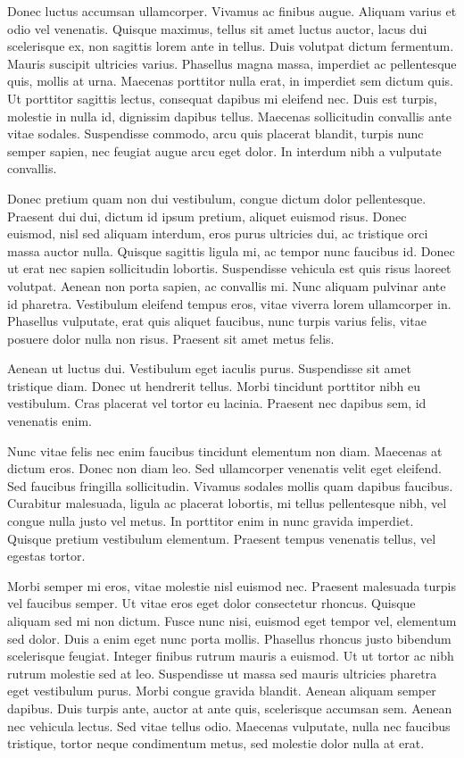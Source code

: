 \documentclass[book,A4paper,10pt,twoside,oldfontcommands]{memoir}\usepackage[]{graphicx}\usepackage[usenames,dvipsnames]{color}
\begin{document}
\begin{btUnit}
Donec luctus accumsan ullamcorper. Vivamus ac finibus augue. Aliquam
varius et odio vel venenatis. Quisque maximus, tellus sit amet luctus
auctor, lacus dui scelerisque ex, non sagittis lorem ante in tellus.
Duis volutpat dictum fermentum. Mauris suscipit ultricies varius.
Phasellus magna massa, imperdiet ac pellentesque quis, mollis at urna.
Maecenas porttitor nulla erat, in imperdiet sem dictum quis. Ut
porttitor sagittis lectus, consequat dapibus mi eleifend nec. Duis est
turpis, molestie in nulla id, dignissim dapibus tellus. Maecenas
sollicitudin convallis ante vitae sodales. Suspendisse commodo, arcu
quis placerat blandit, turpis nunc semper sapien, nec feugiat augue
arcu eget dolor. In interdum nibh a vulputate convallis.

Donec pretium quam non dui vestibulum, congue dictum dolor
pellentesque. Praesent dui dui, dictum id ipsum pretium, aliquet
euismod risus. Donec euismod, nisl sed aliquam interdum, eros purus
ultricies dui, ac tristique orci massa auctor nulla. Quisque sagittis
ligula mi, ac tempor nunc faucibus id. Donec ut erat nec sapien
sollicitudin lobortis. Suspendisse vehicula est quis risus laoreet
volutpat. Aenean non porta sapien, ac convallis mi. Nunc aliquam
pulvinar ante id pharetra. Vestibulum eleifend tempus eros, vitae
viverra lorem ullamcorper in. Phasellus vulputate, erat quis aliquet
faucibus, nunc turpis varius felis, vitae posuere dolor nulla non
risus. Praesent sit amet metus felis.

Aenean ut luctus dui. Vestibulum eget iaculis purus. Suspendisse sit
amet tristique diam. Donec ut hendrerit tellus. Morbi tincidunt
porttitor nibh eu vestibulum. Cras placerat vel tortor eu lacinia.
Praesent nec dapibus sem, id venenatis enim.

Nunc vitae felis nec enim faucibus tincidunt elementum non diam.
Maecenas at dictum eros. Donec non diam leo. Sed ullamcorper venenatis
velit eget eleifend. Sed faucibus fringilla sollicitudin. Vivamus
sodales mollis quam dapibus faucibus. Curabitur malesuada, ligula ac
placerat lobortis, mi tellus pellentesque nibh, vel congue nulla justo
vel metus. In porttitor enim in nunc gravida imperdiet. Quisque
pretium vestibulum elementum. Praesent tempus venenatis tellus, vel
egestas tortor.

Morbi semper mi eros, vitae molestie nisl euismod nec. Praesent
malesuada turpis vel faucibus semper. Ut vitae eros eget dolor
consectetur rhoncus. Quisque aliquam sed mi non dictum. Fusce nunc
nisi, euismod eget tempor vel, elementum sed dolor. Duis a enim eget
nunc porta mollis. Phasellus rhoncus justo bibendum scelerisque
feugiat. Integer finibus rutrum mauris a euismod. Ut ut tortor ac nibh
rutrum molestie sed at leo. Suspendisse ut massa sed mauris ultricies
pharetra eget vestibulum purus. Morbi congue gravida blandit. Aenean
aliquam semper dapibus. Duis turpis ante, auctor at ante quis,
scelerisque accumsan sem. Aenean nec vehicula lectus. Sed vitae tellus
odio. Maecenas vulputate, nulla nec faucibus tristique, tortor neque
condimentum metus, sed molestie dolor nulla at erat.


\end{btUnit}
\end{document}
